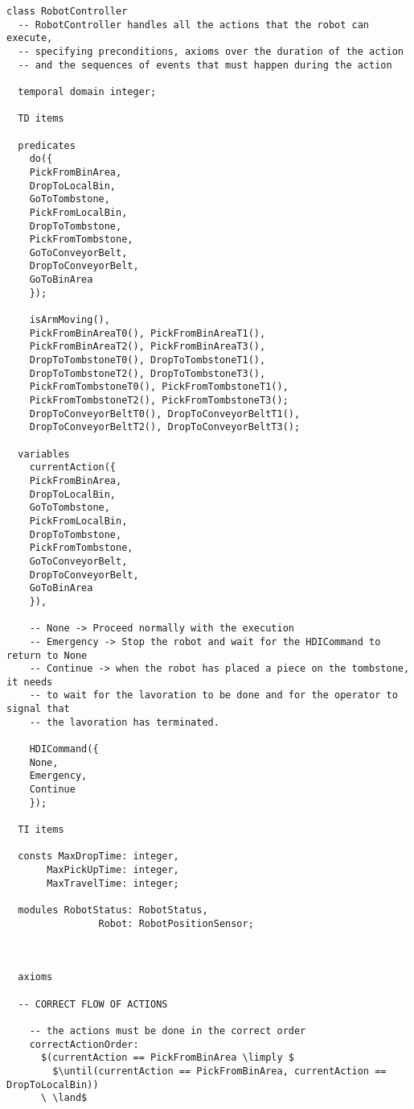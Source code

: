 \begin{lstlisting}[fontadjust, mathescape, frame=single]
class RobotController
  -- RobotController handles all the actions that the robot can execute, 
  -- specifying preconditions, axioms over the duration of the action
  -- and the sequences of events that must happen during the action

  temporal domain integer;

  TD items

  predicates
    do({
    PickFromBinArea,
    DropToLocalBin,
    GoToTombstone,
    PickFromLocalBin,
    DropToTombstone,
    PickFromTombstone,
    GoToConveyorBelt,
    DropToConveyorBelt,
    GoToBinArea
    });

    isArmMoving(),
    PickFromBinAreaT0(), PickFromBinAreaT1(),
    PickFromBinAreaT2(), PickFromBinAreaT3(),
    DropToTombstoneT0(), DropToTombstoneT1(),
    DropToTombstoneT2(), DropToTombstoneT3(),
    PickFromTombstoneT0(), PickFromTombstoneT1(),
    PickFromTombstoneT2(), PickFromTombstoneT3();
    DropToConveyorBeltT0(), DropToConveyorBeltT1(),
    DropToConveyorBeltT2(), DropToConveyorBeltT3();

  variables
    currentAction({
    PickFromBinArea,
    DropToLocalBin,
    GoToTombstone,
    PickFromLocalBin,
    DropToTombstone,
    PickFromTombstone,
    GoToConveyorBelt,
    DropToConveyorBelt,
    GoToBinArea
    }),

    -- None -> Proceed normally with the execution
    -- Emergency -> Stop the robot and wait for the HDICommand to return to None
    -- Continue -> when the robot has placed a piece on the tombstone, it needs 
    -- to wait for the lavoration to be done and for the operator to signal that 
    -- the lavoration has terminated.

    HDICommand({
    None,
    Emergency,
    Continue
    });
    
  TI items 
  
  consts MaxDropTime: integer,
       MaxPickUpTime: integer,
       MaxTravelTime: integer;

  modules RobotStatus: RobotStatus,
                Robot: RobotPositionSensor;

  
  
  axioms

  -- CORRECT FLOW OF ACTIONS

    -- the actions must be done in the correct order
    correctActionOrder:
      $(currentAction == PickFromBinArea \limply $
        $\until(currentAction == PickFromBinArea, currentAction == DropToLocalBin))
      \ \land$


\end{lstlisting}

